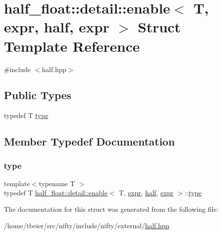 \hypertarget{structhalf__float_1_1detail_1_1enable_3_01T_00_01expr_00_01half_00_01expr_01_4}{}\section{half\+\_\+float\+:\+:detail\+:\+:enable$<$ T, expr, half, expr $>$ Struct Template Reference}
\label{structhalf__float_1_1detail_1_1enable_3_01T_00_01expr_00_01half_00_01expr_01_4}


{\ttfamily \#include $<$half.\+hpp$>$}

\subsection*{Public Types}
\begin{DoxyCompactItemize}
\item 
typedef T \hyperlink{structhalf__float_1_1detail_1_1enable_3_01T_00_01expr_00_01half_00_01expr_01_4_a82a85fe2db8508b2e4731c1bcf0edd99}{type}
\end{DoxyCompactItemize}


\subsection{Member Typedef Documentation}
\mbox{\label{structhalf__float_1_1detail_1_1enable_3_01T_00_01expr_00_01half_00_01expr_01_4_a82a85fe2db8508b2e4731c1bcf0edd99}} 
\subsubsection{\texorpdfstring{type}{type}}
{\footnotesize\ttfamily template$<$typename T $>$ \\
typedef T \hyperlink{structhalf__float_1_1detail_1_1enable}{half\+\_\+float\+::detail\+::enable}$<$ T, \hyperlink{structhalf__float_1_1detail_1_1expr}{expr}, \hyperlink{classhalf__float_1_1half}{half}, \hyperlink{structhalf__float_1_1detail_1_1expr}{expr} $>$\+::\hyperlink{structhalf__float_1_1detail_1_1enable_3_01T_00_01expr_00_01half_00_01expr_01_4_a82a85fe2db8508b2e4731c1bcf0edd99}{type}}



The documentation for this struct was generated from the following file\+:\begin{DoxyCompactItemize}
\item 
/home/tbeier/src/nifty/include/nifty/external/\hyperlink{half_8hpp}{half.\+hpp}\end{DoxyCompactItemize}
